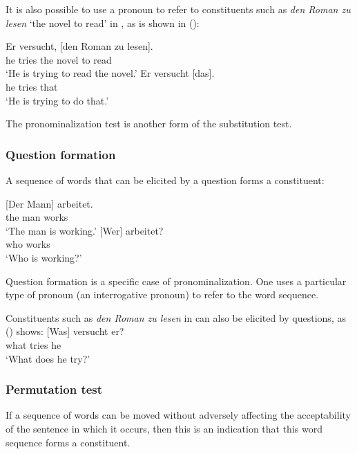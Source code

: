 \noindent
It is also possible to use a pronoun to refer to constituents such as \emph{den Roman zu lesen} `the
novel to read' in , as is shown in ():

\eal
\ex
\gll Er versucht, [den Roman zu lesen].\\
     he tries \spacebr{}the novel to read\\
\glt `He is trying to read the novel.'
\ex 
\gll Er versucht [das].\\
     he tries    \spacebr{}that\\
\glt `He is trying to do that.'
\zl

\noindent
The pronominalization test is another form of the substitution test.

\subsubsection{Question formation}

A sequence of words that can be elicited by a question forms a constituent:

\eal
\ex 
\gll {}[Der Mann] arbeitet.\\
	 \spacebr{}the man works\\
\glt `The man is working.'
\ex 
\gll {}[Wer] arbeitet?\\
     \spacebr{}who works\\
\glt `Who is working?'
\zl

\noindent
Question formation is a specific case of pronominalization. One uses a particular type of pronoun (an interrogative 
pronoun) to refer to the word sequence.

Constituents such as \emph{den Roman zu lesen} in  can also be elicited by questions, as () 
shows:
\ea
\gll {}[Was] versucht er?\\
     \spacebr{}what tries he\\
\glt `What does he try?'
\z



\subsubsection{Permutation test}

If a sequence of words can be moved without adversely affecting the acceptability of the sentence
in which it occurs, then this is an indication that this word sequence forms a constituent.

